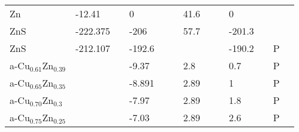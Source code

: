 \begin{landscape}
\begin{center}
\begin{longtable}{|l|p{2.5cm}|l|p{2.5cm}|l|l|p{2.5cm}|l|l|p{2.5cm}|l|l|l|}
Zn               	   & -12.41                     & \citep{Barin1977} & 0                   &     & \citep{Haynes2013}     & 41.6               &     & \citep{Haynes2013} & 0                                   &     & \citep{Haynes2013} &  \\
ZnS              	   & -222.375                   & \citep{Barin1977} & -206                &     & \citep{Haynes2013}     & 57.7               &     & \citep{Haynes2013} & -201.3                              &     & \citep{Haynes2013} &  \\
ZnS              	   & -212.107                   & \citep{Barin1977} & -192.6              &     & \citep{Haynes2013}     &                    &     &     & -190.2                              &     & P   &  \\
a-Cu$_{0.61}$Zn$_{0.39}$   &                            &     & -9.37               &     & \citep{KubaschewskiCatterallJohnAshley.1956}     & 2.8                &     & \citep{KubaschewskiCatterallJohnAshley.1956} & 0.7                                &     & P   &  \\
a-Cu$_{0.65}$Zn$_{0.35}$   &                            &     & -8.891              &     & \citep{KubaschewskiCatterallJohnAshley.1956}     & 2.89               &     & \citep{KubaschewskiCatterallJohnAshley.1956} & 1                                   &     & P   &  \\
a-Cu$_{0.70}$Zn$_{0.3 }$   &                            &     & -7.97               &     & \citep{KubaschewskiCatterallJohnAshley.1956}     & 2.89               &     & \citep{KubaschewskiCatterallJohnAshley.1956} & 1.8                                 &     & P   &  \\
a-Cu$_{0.75}$Zn$_{0.25}$   &                            &     & -7.03               &     & \citep{KubaschewskiCatterallJohnAshley.1956}     & 2.89               &     & \citep{KubaschewskiCatterallJohnAshley.1956} & 2.6                                 &     & P   &  \\

\end{longtable}
\end{center}
\end{landscape}
